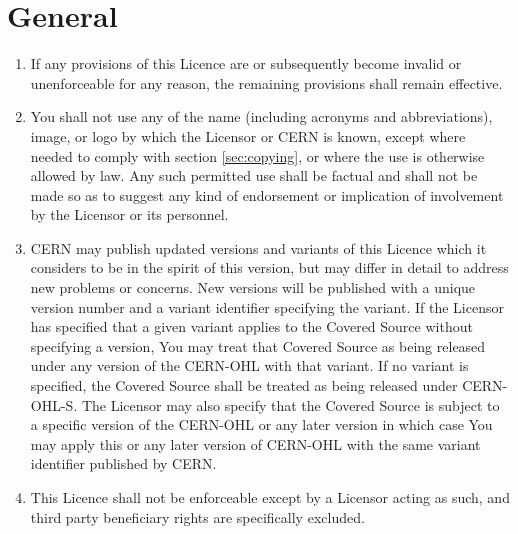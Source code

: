 \documentclass[10pt, a4paper]{article}
\begin{document}
\section{General}
\label{sec:general}
\begin{enumerate}[label=\ref*{sec:general}.\arabic*]

\item
If any provisions of this Licence are or subsequently become invalid or unenforceable for any reason, the remaining provisions shall remain effective.
\item
You shall not use any of the name (including acronyms and abbreviations), image, or logo by which the Licensor or CERN is known, except where  needed to  comply with section \ref*{sec:copying}, or where the use is otherwise allowed by law. Any such permitted use shall be factual and shall not be made so as to suggest any kind of endorsement or implication of involvement by the Licensor or its personnel.
\item
\label{subsec:versions}
CERN may publish updated versions and variants of this Licence which it considers to be in the spirit of this version, but may differ in detail to address new problems or concerns. New versions will be published with a unique version number and a variant identifier specifying the variant. If the Licensor has specified that a given variant applies to the Covered Source without specifying a version, You may treat that Covered Source as being released under any version of the CERN-OHL with that variant. If no variant is specified, the Covered Source shall be treated as being released under CERN-OHL-S. The Licensor may also specify that the Covered Source is subject to a specific version of the CERN-OHL or any later version in which case You may apply this or any later version of CERN-OHL with the same variant identifier published by CERN.
\item
This Licence shall not be enforceable except by a Licensor acting as such, and third party beneficiary rights are specifically excluded.
\end{enumerate}
\end{document}
